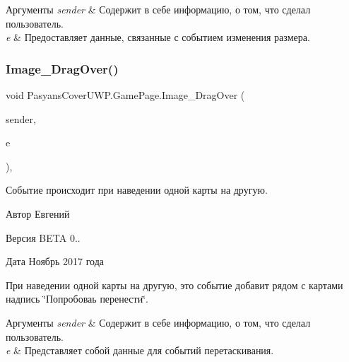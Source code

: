 \begin{DoxyParams}{Аргументы}
{\em sender} & Содержит в себе информацию, о том, что сделал пользователь. \\
\hline
{\em e} & Предоставляет данные, связанные с событием изменения размера. \\
\hline
\end{DoxyParams}
\mbox{\label{class_pasyans_cover_u_w_p_1_1_game_page_a573a74360ad3cd3f0b191668a7c69e93}} 
\subsubsection{\texorpdfstring{Image\+\_\+\+Drag\+Over()}{Image\_DragOver()}}
{\footnotesize\ttfamily void Pasyans\+Cover\+U\+W\+P.\+Game\+Page.\+Image\+\_\+\+Drag\+Over (\begin{DoxyParamCaption}\item[{object}]{sender,  }\item[{Drag\+Event\+Args}]{e }\end{DoxyParamCaption})\hspace{0.3cm}{\ttfamily [inline]}, {\ttfamily [private]}}



Событие происходит при наведении одной карты на другую. 

\begin{DoxyAuthor}{Автор}
Евгений 
\end{DoxyAuthor}
\begin{DoxyVersion}{Версия}
B\+E\+TA 0.. 
\end{DoxyVersion}
\begin{DoxyDate}{Дата}
Ноябрь 2017 года
\end{DoxyDate}
При наведении одной карты на другую, это событие добавит рядом с картами надпись \char`\"{}Попробоваь перенести\char`\"{}. 
\begin{DoxyParams}{Аргументы}
{\em sender} & Содержит в себе информацию, о том, что сделал пользователь. \\
\hline
{\em e} & Представляет собой данные для событий перетаскивания. \\
\hline
\end{DoxyParams}
\mbox{\label{class_pasyans_cover_u_w_p_1_1_game_page_aa682318ae23a5287134042c6fee5bd21}} 
